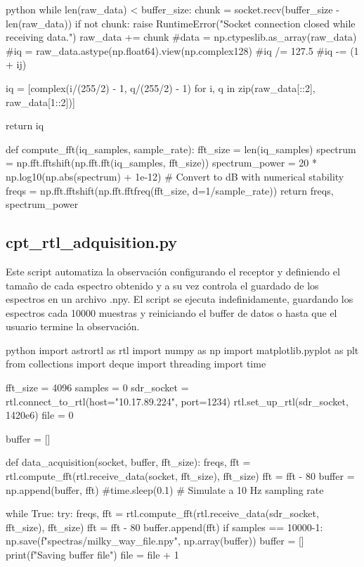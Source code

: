 \begin{appendixs}
\begin{sourcecode}[]{python}{}
        while len(raw_data) < buffer_size:
            chunk = socket.recv(buffer_size - len(raw_data))
            if not chunk:
                raise RuntimeError("Socket connection closed while receiving data.")
            raw_data += chunk
        #data = np.ctypeslib.as_array(raw_data)
        #iq = raw_data.astype(np.float64).view(np.complex128)
        #iq /= 127.5
        #iq -= (1 + ij)
    
        iq  = [complex(i/(255/2) - 1, q/(255/2) - 1) for i, q in zip(raw_data[::2], raw_data[1::2])]
    
        return iq
    
    def compute_fft(iq_samples, sample_rate):
        fft_size = len(iq_samples)
        spectrum = np.fft.fftshift(np.fft.fft(iq_samples, fft_size))
        spectrum_power = 20 * np.log10(np.abs(spectrum) + 1e-12)  # Convert to dB with numerical stability
        freqs = np.fft.fftshift(np.fft.fftfreq(fft_size, d=1/sample_rate))
        return freqs, spectrum_power
\end{sourcecode}

\subsection{cpt\_rtl\_adquisition.py}

Este script automatiza la observación configurando el receptor y definiendo el tamaño de cada espectro obtenido y a su vez controla el guardado de los espectros en un archivo .npy. El script se ejecuta indefinidamente, guardando los espectros cada 10000 muestras y reiniciando el buffer de datos o hasta que el usuario termine la observación.

\begin{sourcecode}[]{python}{}
import astrortl as rtl
import numpy as np
import matplotlib.pyplot as plt
from collections import deque
import threading
import time

fft_size = 4096
samples = 0
sdr_socket = rtl.connect_to_rtl(host="10.17.89.224", port=1234)
rtl.set_up_rtl(sdr_socket, 1420e6)
file = 0

buffer = []

def data_acquisition(socket, buffer, fft_size):
    freqs, fft = rtl.compute_fft(rtl.receive_data(socket, fft_size), fft_size)
    fft = fft - 80
    buffer = np.append(buffer, fft)
        #time.sleep(0.1)  # Simulate a 10 Hz sampling rate

while True:
    try:
        freqs, fft = rtl.compute_fft(rtl.receive_data(sdr_socket, fft_size), fft_size)
        fft = fft - 80
        buffer.append(fft)
        if samples == 10000-1:
            np.save(f"spectras/milky_way_{file}.npy", np.array(buffer))
            buffer = []
            print(f"Saving buffer {file}")
            file = file + 1


\end{sourcecode}
\end{appendixs}
